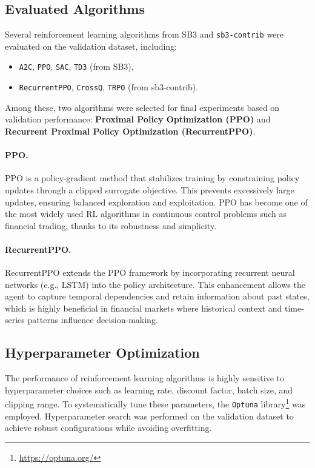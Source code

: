 \documentclass[12pt,a4paper]{report}
\begin{document}
\subsection{Evaluated Algorithms}
Several reinforcement learning algorithms from SB3 and \texttt{sb3-contrib} were evaluated on the validation dataset, including:
\begin{itemize}
    \item \texttt{A2C}, \texttt{PPO}, \texttt{SAC}, \texttt{TD3} (from SB3),
    \item \texttt{RecurrentPPO}, \texttt{CrossQ}, \texttt{TRPO} (from sb3-contrib).
\end{itemize}

Among these, two algorithms were selected for final experiments based on validation performance: \textbf{Proximal Policy Optimization (PPO)} and \textbf{Recurrent Proximal Policy Optimization (RecurrentPPO)}.

\paragraph{PPO.}
PPO is a policy-gradient method that stabilizes training by constraining policy updates through a clipped surrogate objective. This prevents excessively large updates, ensuring balanced exploration and exploitation. PPO has become one of the most widely used RL algorithms in continuous control problems such as financial trading, thanks to its robustness and simplicity.

\paragraph{RecurrentPPO.}
RecurrentPPO extends the PPO framework by incorporating recurrent neural networks (e.g., LSTM) into the policy architecture. This enhancement allows the agent to capture temporal dependencies and retain information about past states, which is highly beneficial in financial markets where historical context and time-series patterns influence decision-making.

\subsection{Hyperparameter Optimization}
The performance of reinforcement learning algorithms is highly sensitive to hyperparameter choices such as learning rate, discount factor, batch size, and clipping range. To systematically tune these parameters, the \texttt{Optuna} library\footnote{\url{https://optuna.org/}} was employed. Hyperparameter search was performed on the validation dataset to achieve robust configurations while avoiding overfitting.
\end{document}
